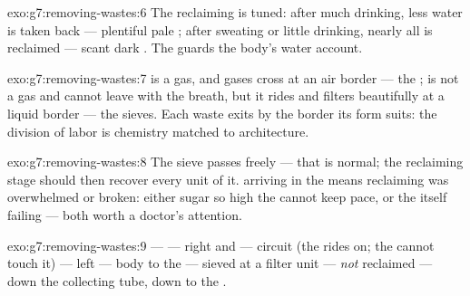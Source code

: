 \begin{solution}{exo:g7:removing-wastes:6}
The reclaiming is tuned: after much drinking, less water
is taken back --- plentiful pale ; after sweating or
little drinking, nearly all is reclaimed --- scant dark
. The  guards the body's water account.
\end{solution}

\begin{solution}{exo:g7:removing-wastes:7}
 is a gas, and gases cross at an air border
--- the ;  is not a gas and cannot leave with
the breath, but it rides  and filters beautifully
at a liquid border --- the sieves. Each waste exits by the
border its form suits: the division of labor is chemistry
matched to architecture.
\end{solution}

\begin{solution}{exo:g7:removing-wastes:8}
The sieve passes  freely --- that is normal; the
reclaiming stage should then recover every unit of it.
 arriving in the  means reclaiming was
overwhelmed or broken: either  sugar so high the
 cannot keep pace, or the  itself failing
--- both worth a doctor's attention.
\end{solution}

\begin{solution}{exo:g7:removing-wastes:9}
  ---  --- right  and 
---  circuit (the  rides on; the  cannot
touch it) --- left  --- body  to the  ---
sieved at a filter unit --- \emph{not} reclaimed --- down
the collecting tube, down to the .
\end{solution}

